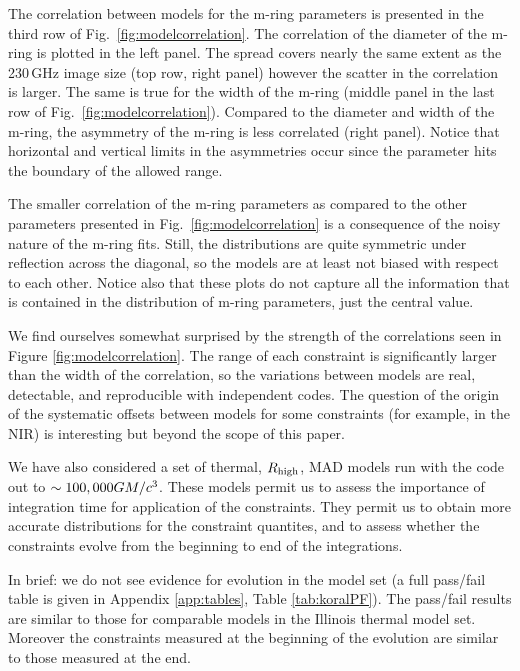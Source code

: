 The correlation between models for the m-ring parameters is presented in the third row of Fig.~\ref{fig:modelcorrelation}. The correlation of the diameter of the m-ring is plotted in the left panel. The spread covers nearly the same extent as the 230\,GHz image size (top row, right panel) however the scatter in the correlation is larger.  The same is true for the width of the m-ring (middle panel in the last row of Fig.~\ref{fig:modelcorrelation}). Compared to the diameter and width of the m-ring, the asymmetry of the m-ring is less correlated (right panel). Notice that horizontal and vertical limits in the asymmetries occur since the parameter hits the boundary of the allowed range.

The smaller correlation of the m-ring parameters as compared to the other parameters presented in Fig.~\ref{fig:modelcorrelation} is a consequence of the noisy nature of the m-ring fits.  Still, the distributions are quite symmetric under reflection across the diagonal, so the models are at least not biased with respect to each other.  Notice also that these plots do not capture all the information that is contained in the distribution of m-ring parameters, just the central value.   

We find ourselves somewhat surprised by the strength of the correlations seen in Figure \ref{fig:modelcorrelation}.  The range of each constraint is significantly larger than the width of the correlation, so the variations between models are real, detectable, and reproducible with independent codes.  The question of the origin of the systematic offsets between models for some constraints (for example, in the NIR) is interesting but beyond the scope of this paper.   




We have also considered a set of thermal, $R_\mathrm{high}$, MAD models run with the \koral code out to $\sim 100,000GM/c^3$.  These models permit us to assess the importance of integration time for application of the constraints.  They permit us to obtain more accurate distributions for the constraint quantites, and to assess whether the constraints evolve from the beginning to end of the integrations. 

In brief: we do not see evidence for evolution in the \koral  model set (a full pass/fail table is given in Appendix \ref{app:tables}, Table \ref{tab:koralPF}).  The \koral pass/fail results are similar to those for comparable models in the Illinois thermal model set.  Moreover the constraints measured at the beginning of the evolution are similar to those measured at the end. 

